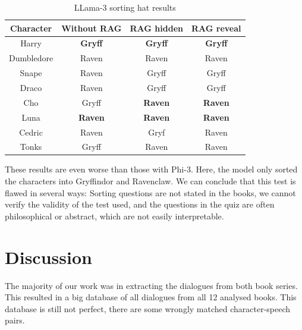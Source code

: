 \documentclass[fleqn,moreauthors,10pt]{ds_report}
\begin{document}
\begin{table}[hbt]
	\caption{LLama-3 sorting hat results}
	\centering
	\begin{tabular}{c | c | c | c }
		Character  & Without RAG    & RAG hidden     & RAG reveal     \\ \hline
		Harry      & \textbf{Gryff} & \textbf{Gryff} & \textbf{Gryff} \\
		Dumbledore & Raven          & Raven          & Raven          \\ \hline
		Snape      & Raven          & Gryff          & Gryff          \\
		Draco      & Raven          & Gryff          & Gryff          \\ \hline
		Cho        & Gryff          & \textbf{Raven} & \textbf{Raven} \\
		Luna       & \textbf{Raven} & \textbf{Raven} & \textbf{Raven} \\ \hline
		Cedric     & Raven          & Gryf           & Raven          \\
		Tonks      & Gryff          & Raven          & Raven          \\
	\end{tabular}
	\label{tab:sorting_hat_results_llama}
\end{table}

These results are even worse than those with Phi-3.
Here, the model only sorted the characters into Gryffindor and Ravenclaw.
We can conclude that this test is flawed in several ways:
Sorting questions are not stated in the books,
we cannot verify the validity of the test used,
and the questions in the quiz are often philosophical or abstract, which are not easily interpretable.


\section*{Discussion}

The majority of our work was in extracting the dialogues from both book series.
This resulted in a big database of all dialogues from all 12 analysed books.
This database is still not perfect, there are some wrongly matched character-speech pairs.



\end{document}
